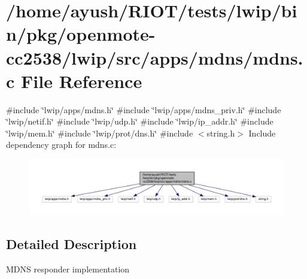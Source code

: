 \hypertarget{openmote-cc2538_2lwip_2src_2apps_2mdns_2mdns_8c}{}\section{/home/ayush/\+R\+I\+O\+T/tests/lwip/bin/pkg/openmote-\/cc2538/lwip/src/apps/mdns/mdns.c File Reference}
\label{openmote-cc2538_2lwip_2src_2apps_2mdns_2mdns_8c}
{\ttfamily \#include \char`\"{}lwip/apps/mdns.\+h\char`\"{}}\newline
{\ttfamily \#include \char`\"{}lwip/apps/mdns\+\_\+priv.\+h\char`\"{}}\newline
{\ttfamily \#include \char`\"{}lwip/netif.\+h\char`\"{}}\newline
{\ttfamily \#include \char`\"{}lwip/udp.\+h\char`\"{}}\newline
{\ttfamily \#include \char`\"{}lwip/ip\+\_\+addr.\+h\char`\"{}}\newline
{\ttfamily \#include \char`\"{}lwip/mem.\+h\char`\"{}}\newline
{\ttfamily \#include \char`\"{}lwip/prot/dns.\+h\char`\"{}}\newline
{\ttfamily \#include $<$string.\+h$>$}\newline
Include dependency graph for mdns.\+c\+:
\nopagebreak
\begin{figure}[H]
\begin{center}
\leavevmode
\includegraphics[width=350pt]{openmote-cc2538_2lwip_2src_2apps_2mdns_2mdns_8c__incl}
\end{center}
\end{figure}


\subsection{Detailed Description}
M\+D\+NS responder implementation 